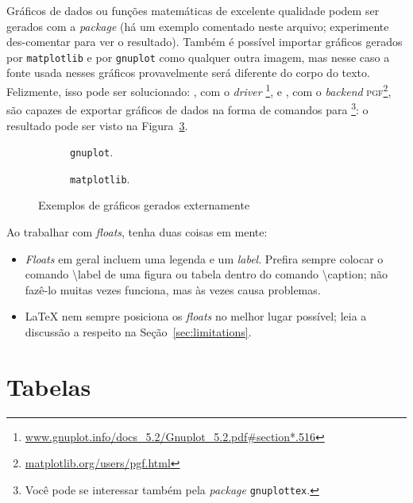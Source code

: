 Gráficos de dados ou funções matemáticas de excelente qualidade podem ser
gerados com a \textit{package}  (há um exemplo comentado neste
arquivo; experimente des-comentar para ver o resultado). Também é possível
importar gráficos gerados por \texttt{matplotlib} e por \texttt{gnuplot}
como qualquer outra imagem, mas nesse caso a fonte usada nesses gráficos
provavelmente será diferente do corpo do texto. Felizmente, isso pode ser
solucionado: , com o \emph{driver} \footnote{
\url{www.gnuplot.info/docs\_5.2/Gnuplot\_5.2.pdf\#section*.516}}, e
, com o \emph{backend} \textsc{pgf}\footnote{
\url{matplotlib.org/users/pgf.html}}, são capazes de exportar gráficos de
dados na forma de comandos para \footnote{Você pode se interessar
também pela \textit{package} \texttt{gnuplottex}.}: o resultado pode ser
visto na Figura~\ref{fig:graficos}.

\begin{figure}
  \centering
  \begin{subfigure}[b]{.45\textwidth}
    \caption{\texttt{gnuplot}.\label{fig:gnuplot}}
  \end{subfigure}
  \begin{subfigure}[b]{.5\textwidth}
    
    \caption{\texttt{matplotlib}.\label{fig:matplotlib}}
  \end{subfigure}
  \caption{Exemplos de gráficos gerados externamente}\label{fig:graficos}
\end{figure}

Ao trabalhar com \emph{floats}, tenha duas coisas em mente:

\begin{itemize}

  \item \emph{Floats} em geral incluem uma legenda e um \emph{label}.
  Prefira sempre colocar o comando \textsf{\textbackslash{}label} de uma
  figura ou tabela dentro do comando \textsf{\textbackslash{}caption};
  não fazê-lo muitas vezes funciona, mas às vezes causa problemas.

  \item \LaTeX{} nem sempre posiciona os \emph{floats} no melhor lugar
  possível; leia a discussão a respeito na Seção~\ref{sec:limitations}.

\end{itemize}

\section{Tabelas}

